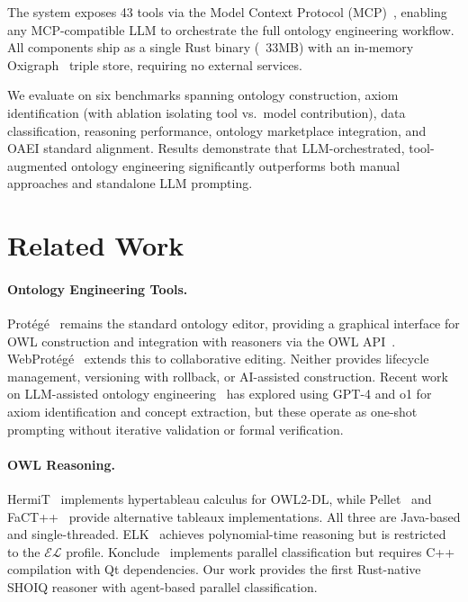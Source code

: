 \documentclass[runningheads]{llncs}
\begin{document}
The system exposes 43 tools via the Model Context Protocol (MCP)~\cite{mcp}, enabling any MCP-compatible LLM to orchestrate the full ontology engineering workflow. All components ship as a single Rust binary (~33MB) with an in-memory Oxigraph~\cite{oxigraph} triple store, requiring no external services.

We evaluate on six benchmarks spanning ontology construction, axiom identification (with ablation isolating tool vs.\ model contribution), data classification, reasoning performance, ontology marketplace integration, and OAEI standard alignment. Results demonstrate that LLM-orchestrated, tool-augmented ontology engineering significantly outperforms both manual approaches and standalone LLM prompting.


\section{Related Work}
\label{sec:related}

\paragraph{Ontology Engineering Tools.}
Prot\'eg\'e~\cite{protege} remains the standard ontology editor, providing a graphical interface for OWL construction and integration with reasoners via the OWL API~\cite{owlapi}. WebProt\'eg\'e~\cite{webprotege} extends this to collaborative editing. Neither provides lifecycle management, versioning with rollback, or AI-assisted construction. Recent work on LLM-assisted ontology engineering~\cite{ontoaxiom,llm4onto} has explored using GPT-4 and o1 for axiom identification and concept extraction, but these operate as one-shot prompting without iterative validation or formal verification.

\paragraph{OWL Reasoning.}
HermiT~\cite{hermit} implements hypertableau calculus for OWL2-DL, while Pellet~\cite{pellet} and FaCT++~\cite{factpp} provide alternative tableaux implementations. All three are Java-based and single-threaded. ELK~\cite{elk} achieves polynomial-time reasoning but is restricted to the $\mathcal{EL}$ profile. Konclude~\cite{konclude} implements parallel classification but requires C++ compilation with Qt dependencies. Our work provides the first Rust-native SHOIQ reasoner with agent-based parallel classification.
\end{document}

